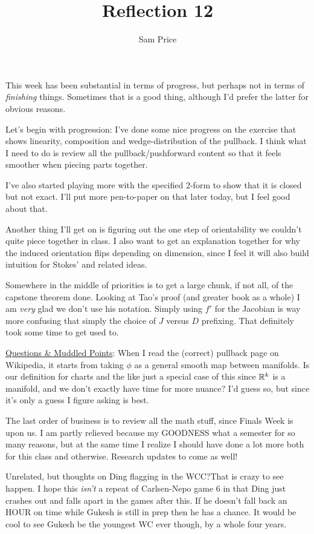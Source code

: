 \documentclass[12pt]{article}
\author{Sam Price}
\title{Reflection 12}
\begin{document}
\maketitle

This week has been substantial in terms of progress, but perhaps not in terms of \emph{finishing} things.
Sometimes that is a good thing, although I'd prefer the latter for obvious reasons.

Let's begin with progression:
I've done some nice progress on the exercise that shows linearity,
composition and wedge-distribution of the pullback.
I think what I need to do is review all the pullback/pushforward content so that it feels smoother
when piecing parts together.

I've also started playing more with the specified 2-form to show that it is closed but not exact.
I'll put more pen-to-paper on that later today, but I feel good about that.

Another thing I'll get on is figuring out the one step of orientability we couldn't quite piece together in class.
I also want to get an explanation together for why the induced orientation flips depending on dimension, since
I feel it will also build intuition for Stokes' and related ideas.

Somewhere in the middle of priorities is to get a large chunk, if not all, of the capstone theorem done.
Looking at Tao's proof (and greater book as a whole) I am \emph{very} glad we don't use his notation.
Simply using $f'$ for the Jacobian is way more confusing that simply the choice of $J$ versus $D$ prefixing.
That definitely took some time to get used to.

\underline{Questions \& Muddled Points}:
When I read the (correct) pullback page on Wikipedia, it starts from taking $\phi$ as a general
smooth map between manifolds.
Is our definition for charts and the like just a special case of this since $\RR[k]$ is a manifold,
and we don't exactly have time for more nuance? I'd guess so, but since it's only a guess I figure asking is best.

The last order of business is to review all the math stuff, since Finals Week is upon us.
I am partly relieved because my GOODNESS what a semester for so many reasons, but at the same time I realize
I should have done a lot more both for this class and otherwise. Research updates to come as well!

Unrelated, but thoughts on Ding flagging in the WCC?\@ That is crazy to see happen.
I hope this \emph{isn't} a repeat of Carlsen-Nepo game 6 in that Ding just crashes out and falls apart
in the games after this. If he doesn't fall back an HOUR on time while Gukesh is still in prep then he has a chance.
It would be cool to see Gukesh be the youngest WC ever though, by a whole four years.
\end{document}
